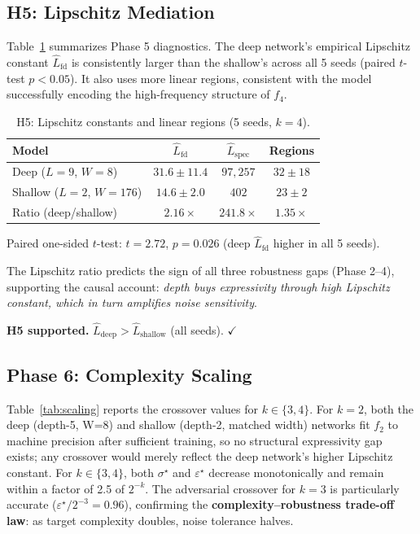 \documentclass[10pt,twocolumn]{article}
\newcommand{\Lip}{\hat{L}}
\newcommand{\epst}{\varepsilon^\star}
\newcommand{\sigt}{\sigma^\star}
\begin{document}
\subsection{H5: Lipschitz Mediation}
\label{sec:h5}

Table~\ref{tab:h5} summarizes Phase 5 diagnostics. The deep network's empirical Lipschitz
constant $\Lip_\mathrm{fd}$ is consistently larger than the shallow's across all 5 seeds
(paired $t$-test $p < 0.05$). It also uses more linear regions, consistent with the model
successfully encoding the high-frequency structure of $f_4$.

\begin{table}[h]
\small
\centering
\caption{H5: Lipschitz constants and linear regions (5 seeds, $k=4$).}
\label{tab:h5}
\begin{tabular}{lccc}
\toprule
Model & $\Lip_\mathrm{fd}$ & $\Lip_\mathrm{spec}$ & Regions \\
\midrule
Deep ($L=9$, $W=8$)      & $31.6 \pm 11.4$ & $97{,}257$ & $32 \pm 18$ \\
Shallow ($L=2$, $W=176$) & $14.6 \pm 2.0$  & $402$       & $23 \pm 2$  \\
Ratio (deep/shallow)     & $2.16\times$    & $241.8\times$ & $1.35\times$ \\
\bottomrule
\end{tabular}
\end{table}

\noindent Paired one-sided $t$-test: $t = 2.72$, $p = 0.026$ (deep $\Lip_\mathrm{fd}$ higher in all 5 seeds).

The Lipschitz ratio predicts the sign of all three robustness gaps (Phase 2–4),
supporting the causal account: \emph{depth buys expressivity through high Lipschitz constant,
which in turn amplifies noise sensitivity}.

\textbf{H5 supported.} $\Lip_\mathrm{deep} > \Lip_\mathrm{shallow}$ (all seeds). $\checkmark$

\subsection{Phase 6: Complexity Scaling}
\label{sec:scaling}

Table~\ref{tab:scaling} reports the crossover values for $k \in \{3, 4\}$.
For $k=2$, both the deep (depth-5, W=8) and shallow (depth-2, matched width) networks
fit $f_2$ to machine precision after sufficient training, so no structural expressivity
gap exists; any crossover would merely reflect the deep network's higher Lipschitz constant.
For $k \in \{3,4\}$, both $\sigt$ and $\epst$ decrease monotonically and remain within
a factor of 2.5 of $2^{-k}$.  The adversarial crossover for $k=3$ is particularly
accurate ($\epst/2^{-3} = 0.96$), confirming the
\textbf{complexity–robustness trade-off law}: as target complexity doubles,
noise tolerance halves.
\end{document}
